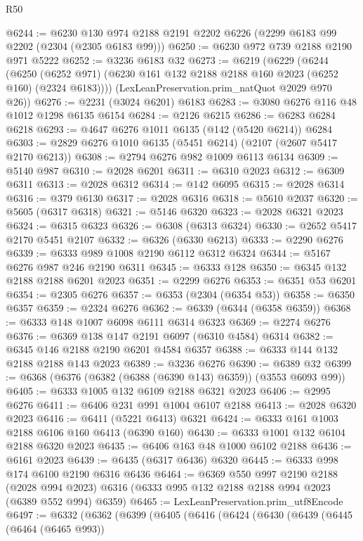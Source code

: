 \begin{lexlean}{R50}
\begin{coremodule}
@6244 := @6230 @130 @974 @2188 @2191 @2202 @6226 (@2299 @6183 @99 @2202 (@2304 (@2305 @6183 @99)))
@6250 := @6230 @972 @739 @2188 @2190 @971 @5222
@6252 := @3236 @6183 @32
@6273 := @6219
    (@6229
      (@6244
        (@6250 (@6252 @971) (@6230 @161 @132 @2188 @2188 @160 @2023 (@6252 @160) (@2324 @6183))))
      (LexLeanPreservation.prim_natQuot @2029 @970 @26))
@6276 := @2231 (@3024 @6201) @6183
@6283 := @3080 @6276 @116 @48 @1012 @1298 @6135 @6154
@6284 := @2126 @6215
@6286 := @6283 @6284 @6218
@6293 := @4647 @6276 @1011 @6135 (@142 (@5420 @6214)) @6284
@6303 := @2829 @6276 @1010 @6135 (@5451 @6214) (@2107 (@2607 @5417 @2170 @6213))
@6308 := @2794 @6276 @982 @1009 @6113 @6134
@6309 := @5140 @987
@6310 := @2028 @6201
@6311 := @6310 @2023
@6312 := @6309 @6311
@6313 := @2028 @6312
@6314 := @142 @6095
@6315 := @2028 @6314
@6316 := @379 @6130
@6317 := @2028 @6316
@6318 := @5610 @2037
@6320 := @5605 (@6317 @6318)
@6321 := @5146 @6320
@6323 := @2028 @6321 @2023
@6324 := @6315 @6323
@6326 := @6308 (@6313 @6324)
@6330 := @2652 @5417 @2170 @5451 @2107
@6332 := @6326 (@6330 @6213)
@6333 := @2290 @6276
@6339 := @6333 @989 @1008 @2190 @6112 @6312 @6324
@6344 := @5167 @6276 @987 @246 @2190 @6311
@6345 := @6333 @128
@6350 := @6345 @132 @2188 @2188 @6201 @2023
@6351 := @2299 @6276
@6353 := @6351 @53 @6201
@6354 := @2305 @6276
@6357 := @6353 (@2304 (@6354 @53))
@6358 := @6350 @6357
@6359 := @2324 @6276
@6362 := @6339 (@6344 (@6358 @6359))
@6368 := @6333 @148 @1007 @6098 @6111 @6314 @6323
@6369 := @2274 @6276
@6376 := @6369 @138 @147 @2191 @6097 (@6310 @4584) @6314
@6382 := @6345 @146 @2188 @2190 @6201 @4584 @6357
@6388 := @6333 @144 @132 @2188 @2188 @143 @2023
@6389 := @3236 @6276
@6390 := @6389 @32
@6399 := @6368 (@6376 (@6382 (@6388 (@6390 @143) @6359)) (@3553 @6093 @99))
@6405 := @6333 @1005 @132 @6109 @2188 @6321 @2023
@6406 := @2995 @6276
@6411 := @6406 @231 @991 @1004 @6107 @2188
@6413 := @2028 @6320 @2023
@6416 := @6411 (@5221 @6413) @6321
@6424 := @6333 @161 @1003 @2188 @6106 @160 @6413 (@6390 @160)
@6430 := @6333 @1001 @132 @6104 @2188 @6320 @2023
@6435 := @6406 @163 @48 @1000 @6102 @2188
@6436 := @6161 @2023
@6439 := @6435 (@6317 @6436) @6320
@6445 := @6333 @998 @174 @6100 @2190 @6316 @6436
@6464 := @6369
    @550
    @997
    @2190
    @2188
    (@2028 @994 @2023)
    @6316
    (@6333 @995 @132 @2188 @2188 @994 @2023 (@6389 @552 @994) @6359)
@6465 := LexLeanPreservation.prim_utf8Encode
@6497 := @6332
    (@6362
      (@6399
        (@6405
          (@6416
            (@6424
              (@6430
                (@6439
                  (@6445
                    (@6464 (@6465 @993))

\end{coremodule}
\end{lexlean}
